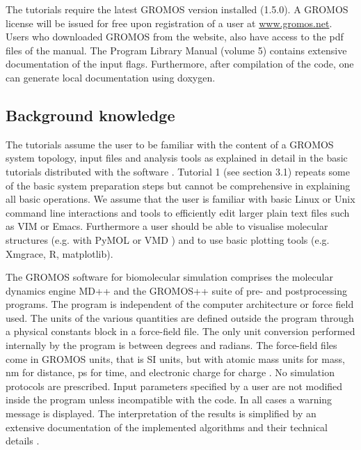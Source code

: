 The tutorials require the latest GROMOS version installed (1.5.0). A GROMOS license will be issued for free upon registration of a user at \url{www.gromos.net}.  
Users who downloaded GROMOS from the website, also have access to the pdf files of the manual. The Program Library Manual (volume 5) \cite{volume_5} 
contains extensive documentation of the input flags. Furthermore, after compilation of the code, one can generate local documentation using doxygen.

\subsection{Background knowledge}
%
The tutorials assume the user to be familiar with the content of a GROMOS system topology, input files and analysis tools as explained in detail in the basic tutorials distributed with the software \cite{volume_7}. 
Tutorial 1 (see section 3.1) repeats some of the basic system preparation steps but cannot be comprehensive in explaining all basic operations. We assume that the user is familiar with basic Linux or Unix 
command line interactions and tools to efficiently edit larger plain text files such as VIM or Emacs. Furthermore a user should be able to visualise molecular structures (e.g. with PyMOL \cite{pymol} or VMD \cite{HUMP96}) 
and to use basic plotting tools (e.g. Xmgrace, R, matplotlib).  

The GROMOS software for biomolecular simulation comprises the molecular dynamics engine MD++ and the \linebreak GROMOS++ suite of pre- and postprocessing programs. The program is independent of the computer architecture or force field used. 
The units of the various quantities are defined outside the program through a physical constants block in a force-field file. The only unit conversion performed internally by the program is between degrees and radians. The force-field files come 
in GROMOS units, that is SI units, but with atomic mass units for mass, nm for distance, ps for time, and electronic charge for charge \cite{volume_6}. No simulation protocols are prescribed. Input parameters specified by a user are not modified inside 
the program unless incompatible with the code. In all cases a warning message is displayed. The interpretation of the results is simplified by an extensive documentation of the implemented algorithms and their technical details \cite{volume_6,volume_2}.



